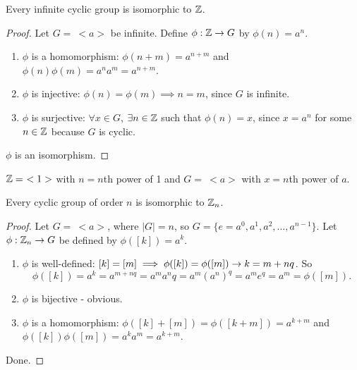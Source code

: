 \documentclass[]{article}
\begin{document}
\begin{theorem}
	Every infinite cyclic group is isomorphic to $\mathbb{Z}$.
\end{theorem}
\begin{proof}
	Let $G =\ <a>$ be infinite. Define $\phi:\mathbb{Z}\rightarrow G$ by $\phi(n) = a^n$.
	\begin{enumerate}
		\item $\phi$ is a homomorphism: $\phi(n+m) = a^{n+m}$ and $\phi(n)\phi(m) = a^na^m = a^{n+m}$.
		\item $\phi$ is injective: $\phi(n) = \phi(m) \implies n = m$, since $G$ is infinite.
		\item $\phi$ is surjective: $\forall x\in G$, $\exists n\in\mathbb{Z}$ such that $\phi(n) = x$, since $x = a^n$ for some $n\in\mathbb{Z}$ because $G$ is cyclic.
	\end{enumerate}
	$\phi$ is an isomorphism.
\end{proof}
\begin{remark}
	$\mathbb{Z} =\ <1>$ with $n = n$th power of 1 and $G =\ <a>$ with $x = n$th power of $a$.
\end{remark}

\begin{theorem}
	Every cyclic group of order $n$ is isomorphic to $\mathbb{Z}_n$.
\end{theorem}
\begin{proof}
	Let $G =\ <a>$, where $|G| = n$, so $G = \{e=a^0,a^1,a^2,\dots,a^{n-1}\}$.
	Let $\phi:\mathbb{Z}_n\rightarrow G$ be defined by $\phi([k]) = a^k$.
	\begin{enumerate}
		\item $\phi$ is well-defined: $[k] = [m] \implies \phi([k]) = \phi([m]) \rightarrow k = m+nq$. 
			So $$\phi([k]) = a^k = a^{m+nq} = a^ma^nq = a^m(a^n)^q = a^me^q = a^m = \phi([m]).$$
		\item $\phi$ is bijective - obvious.
		\item $\phi$ is a homomorphism: $\phi([k]+[m]) = \phi([k+m]) = a^{k+m}$ and $\phi([k])\phi([m]) = a^ka^m = a^{k+m}$.
	\end{enumerate}
	Done.
\end{proof}
\end{document}

